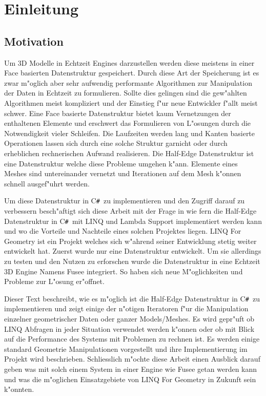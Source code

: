 \documentclass[pagesize, paper=a4, fontsize=12pt,titlepage=true, headings=small, headnosepline, abstractoff, liststotoc, nochapterprefix, plainheadsepline]{scrreprt}
\newcommand{\CSS}{C\texttt{\# }}
\newcommand{\LFGS}{LINQ For Geometry }
\newcommand{\HES}{Half-Edge Datenstruktur }
\begin{document}

\chapter {Einleitung}
	\section {Motivation}
Um 3D Modelle in Echtzeit Engines darzustellen werden diese meistens in einer Face basierten Datenstruktur gespeichert. Durch diese Art der Speicherung ist es zwar m"oglich aber sehr aufwendig performante Algorithmen zur Manipulation der Daten in Echtzeit zu formulieren. Sollte dies gelingen sind die gew"ahlten Algorithmen meist kompliziert und der Einstieg f"ur neue Entwickler f"allt meist schwer. Eine Face basierte Datenstruktur bietet kaum Vernetzungen der enthaltenen Elemente und erschwert das Formulieren von L"osungen durch die Notwendigkeit vieler Schleifen. Die Laufzeiten werden lang und Kanten basierte Operationen lassen sich durch eine solche Struktur garnicht oder durch erheblichen rechnerischen Aufwand realisieren. Die \HES ist eine Datenstruktur welche diese Probleme umgehen k"ann. Elemente eines Meshes sind untereinander vernetzt und Iterationen auf dem Mesh k"onnen schnell ausgef"uhrt werden.
\newline

Um diese Datenstruktur in \CSS zu implementieren und den Zugriff darauf zu verbessern besch"aftigt sich diese Arbeit mit der Frage in wie fern die \HES in \CSS mit LINQ und Lambda Support implementiert werden kann und wo die Vorteile und Nachteile eines solchen Projektes liegen. \LFGS ist ein Projekt welches sich w"ahrend seiner Entwicklung stetig weiter entwickelt hat. Zuerst wurde nur eine Datenstruktur entwickelt. Um sie allerdings zu testen und den Nutzen zu erforschen wurde die Datenstruktur in eine Echtzeit 3D Engine Namens Fusee integriert. So haben sich neue M"oglichkeiten und Probleme zur L"osung er"offnet.
\newline

Dieser Text beschreibt, wie es m"oglich ist die \HES in \CSS zu implementieren und zeigt einige der n"otigen Iteratoren f"ur die Manipulation einzelner geometrischer Daten oder ganzer Models/Meshes. Es wird gepr"uft ob LINQ Abfragen in jeder Situation verwendet werden k"onnen oder ob mit Blick auf die Performance des Systems mit Problemen zu rechnen ist. Es werden einige standard Geometrie Manipulationen vorgestellt und ihre Implementierung im Projekt wird beschrieben. Schliesslich m"ochte diese Arbeit einen Ausblick darauf geben was mit solch einem System in einer Engine wie Fusee getan werden kann und was die m"oglichen Einsatzgebiete von \LFGS in Zukunft sein k"onnten.
\newline
\end{document}
